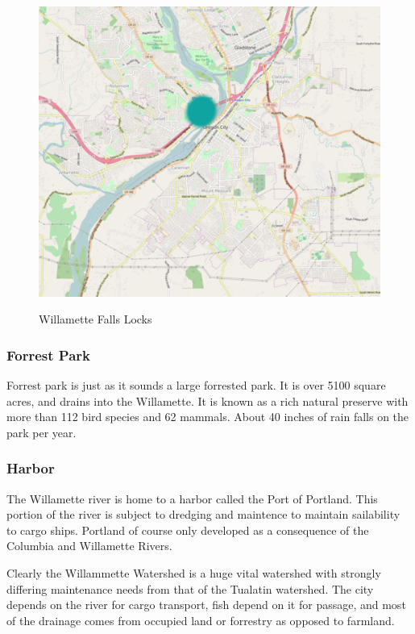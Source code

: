 \documentclass{article}
\begin{document}
\begin{figure}[H]
\centering{}
\caption{Willamette Falls Locks}
\includegraphics[width=\textwidth]{willLock}\label{willLocks}
\end{figure}

\subsubsection{Forrest Park}
Forrest park is just as it sounds a large forrested park. It is over 5100 square acres, and drains into the Willamette.
It is known as a rich natural preserve with more than 112 bird species and 62 mammals. About 40 inches of rain falls on 
the park per year.

\subsubsection{Harbor}
The Willamette river is home to a harbor called the Port of Portland. This portion of the river is subject to dredging and
maintence to maintain sailability to cargo ships. Portland of course only developed as a consequence of the Columbia and 
Willamette Rivers.

Clearly the Willammette Watershed is a huge vital watershed with strongly differing maintenance needs from that of the
Tualatin watershed. The city depends on the river for cargo transport, fish depend on it for passage, and most of the
drainage comes from occupied land or forrestry as opposed to farmland.
\end{document}
